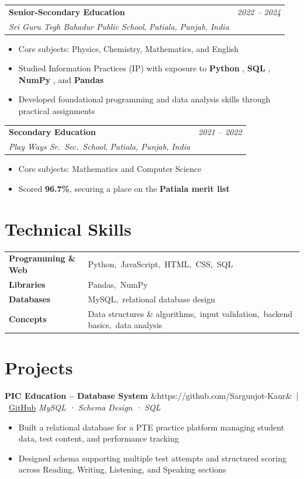 \documentclass[11pt, a4paper]{article}
\makeatletter
\newcommand{\cventry}[5]{%
  \begin{tabularx}{\linewidth}{@{}X r@{}}
    \textbf{#2} & \textit{\small #1} \\
    \textit{\small #3}, \textit{\small #4} & \\
  \end{tabularx}
  \vspace{2pt}
  #5
  \vspace{6pt}
}
\newcommand{\cvproject}[4]{%
  \textbf{#1}%
  \ifx&#2&\else\ \textcolor{muted}{\small|\ \href{#2}{GitHub}}\fi
  \hfill \textcolor{muted}{\small\textit{#3}}\\[2pt]
  #4
  \vspace{6pt}
}
\newcommand{\cvtag}[1]{%
  \textcolor{accent}{\small\textbf{#1}}%
}
\newenvironment{cvlist}{%
  \begin{itemize}[leftmargin=1.4em, itemsep=1pt, parsep=0pt, topsep=2pt]
}{%
  \end{itemize}
}
\makeatother
\begin{document}
\cventry{2022 -- 2024}{Senior-Secondary Education}{Sri Guru Tegh Bahadur Public School}{Patiala, Punjab, India}{%
  \begin{cvlist}
    \item Core subjects: Physics, Chemistry, Mathematics, and English
    \item Studied Information Practices (IP) with exposure to
          \cvtag{Python}, \cvtag{SQL}, \cvtag{NumPy}, and \cvtag{Pandas}
    \item Developed foundational programming and data analysis skills through practical assignments
  \end{cvlist}
}

\cventry{2021 -- 2022}{Secondary Education}{Play Ways Sr.\ Sec.\ School}{Patiala, Punjab, India}{%
  \begin{cvlist}
    \item Core subjects: Mathematics and Computer Science
    \item Scored \textbf{96.7\%}, securing a place on the \textbf{Patiala merit list}
  \end{cvlist}
}



\section{Technical Skills}

\renewcommand{\arraystretch}{1.35}
\begin{tabularx}{\linewidth}{@{}>{\bfseries\small}p{3.2cm} X@{}}
  Programming \& Web &
    Python,\ JavaScript,\ HTML,\ CSS,\ SQL \\
  Libraries &
    Pandas,\ NumPy \\
  Databases &
    MySQL,\ relational database design \\
  Concepts &
    Data structures \& algorithms,\ input validation,\
    backend basics,\ data analysis \\
\end{tabularx}
\renewcommand{\arraystretch}{1}



\section{Projects}

\cvproject%
  {PIC Education -- Database System}%
  {https://github.com/Sargunjot-Kaur}%
  {MySQL · Schema Design · SQL}%
  {%
    \begin{cvlist}
      \item Built a relational database for a PTE practice platform managing student data,
            test content, and performance tracking
      \item Designed schema supporting multiple test attempts and structured scoring
            across Reading, Writing, Listening, and Speaking sections
    \end{cvlist}
  }
\end{document}
